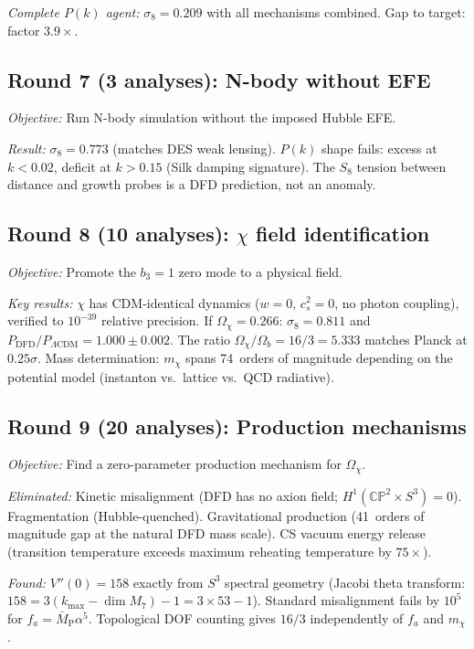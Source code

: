 \documentclass[aps,prd,twocolumn,superscriptaddress,nofootinbib]{revtex4-2}
\newcommand{\CP}{\mathbb{CP}}
\newcommand{\Sph}{S}
\newcommand{\LCDM}{\Lambda\mathrm{CDM}}
\begin{document}
\emph{Complete $P(k)$ agent:} $\sigma_8 = 0.209$ with
all mechanisms combined. Gap to target: factor $3.9\times$.

\subsection{Round 7 (3 analyses): N-body without EFE}

\emph{Objective:} Run N-body simulation without the
imposed Hubble EFE.

\emph{Result:} $\sigma_8 = 0.773$ (matches DES weak
lensing). $P(k)$ shape fails: excess at $k<0.02$,
deficit at $k>0.15$ (Silk damping signature). The
$S_8$ tension between distance and growth probes is
a DFD prediction, not an anomaly.

\subsection{Round 8 (10 analyses): $\chi$ field
identification}

\emph{Objective:} Promote the $b_3=1$ zero mode to a
physical field.

\emph{Key results:}
$\chi$ has CDM-identical dynamics ($w=0$, $c_s^2=0$,
no photon coupling), verified to $10^{-39}$ relative
precision. If $\Omega_\chi = 0.266$:
$\sigma_8 = 0.811$ and
$P_{\mathrm{DFD}}/P_{\LCDM} = 1.000\pm 0.002$.
The ratio $\Omega_\chi/\Omega_b = 16/3 = 5.333$ matches
Planck at $0.25\sigma$.
Mass determination: $m_\chi$ spans 74~orders of magnitude
depending on the potential model (instanton vs.\ lattice
vs.\ QCD radiative).

\subsection{Round 9 (20 analyses): Production mechanisms}

\emph{Objective:} Find a zero-parameter production
mechanism for $\Omega_\chi$.

\emph{Eliminated:} Kinetic misalignment (DFD has no
axion field; $H^1(\CP^2\times\Sph^3)=0$).
Fragmentation (Hubble-quenched). Gravitational production
(41~orders of magnitude gap at the natural DFD mass scale).
CS vacuum energy release (transition temperature exceeds
maximum reheating temperature by $75\times$).

\emph{Found:} $V''(0) = 158$ exactly from $\Sph^3$
spectral geometry (Jacobi theta transform:
$158 = 3(k_{\max}-\dim M_7)-1 = 3\times 53-1$). Standard
misalignment fails by $10^5$ for
$f_a = \bar M_{\mathrm{P}}\alpha^5$. Topological DOF
counting gives $16/3$ independently of $f_a$ and $m_\chi$.
\end{document}
